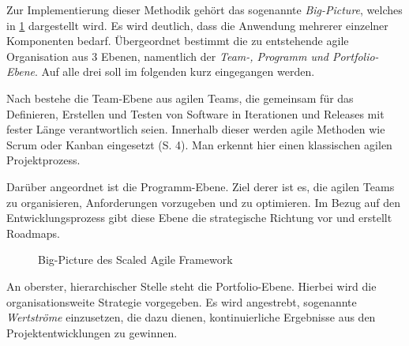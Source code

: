 Zur Implementierung dieser Methodik gehört das sogenannte \textit{Big-Picture}, welches in \ref{fig:safe} dargestellt wird. Es wird deutlich, dass die Anwendung mehrerer einzelner Komponenten bedarf. Übergeordnet bestimmt die zu entstehende agile Organisation aus 3 Ebenen, namentlich der \textit{Team-, Programm und Portfolio-Ebene}. Auf alle drei soll im folgenden kurz eingegangen werden.

Nach  bestehe die Team-Ebene aus agilen Teams, die gemeinsam für das Definieren, Erstellen und Testen von Software in Iterationen und Releases mit fester Länge verantwortlich seien. Innerhalb dieser werden agile Methoden wie Scrum oder Kanban eingesetzt (S. 4). Man erkennt hier einen klassischen agilen Projektprozess.

Darüber angeordnet ist die Programm-Ebene. Ziel derer ist es, die agilen Teams zu organisieren, Anforderungen vorzugeben und zu optimieren. Im Bezug auf den Entwicklungsprozess gibt diese Ebene die strategische Richtung vor und erstellt Roadmaps. \cite[S. 5]{turetken_assessing_2017}

\begin{figure}[H]
	\centering
	\caption[Big-Picture des Scaled Agile Framework]{Big-Picture des Scaled Agile Framework \protect \cite[S. 4]{turetken_assessing_2017}}
	\label{fig:safe}
\end{figure}

An oberster, hierarchischer Stelle  steht  die Portfolio-Ebene. Hierbei wird die organisationsweite Strategie vorgegeben. Es wird angestrebt, sogenannte \textit{Wertströme} einzusetzen, die dazu dienen, kontinuierliche  Ergebnisse aus den Projektentwicklungen zu gewinnen.

